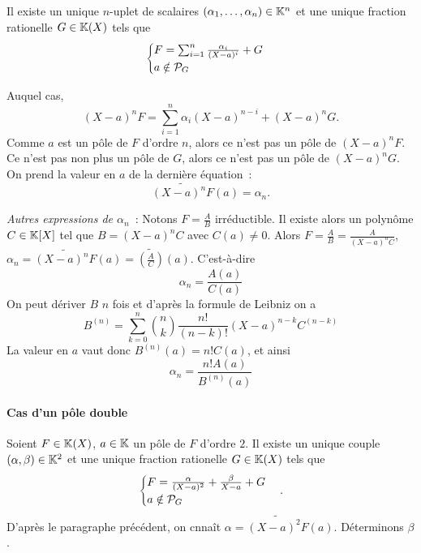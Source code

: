 \begin{theo}
  Il existe un unique \(n\)-uplet de scalaires \((\alpha_1, \ldots, \alpha_n) \in \K^n\) et une unique fraction rationelle \(G \in \K(X)\) tels que
  \begin{equation}
    \begin{cases}
      F = \sum_{i=1}^n \frac{\alpha_i}{(X-a)^i} +G \\
      a \notin \P_G
    \end{cases}
  \end{equation}
\end{theo}

Auquel cas,
\begin{equation}
  (X-a)^nF = \sum_{i=1}^n \alpha_i(X-a)^{n-i} +(X-a)^nG.
\end{equation}
Comme \(a\) est un pôle de \(F\) d'ordre \(n\), alors ce n'est pas un pôle de \((X-a)^nF\). Ce n'est pas non plus un pôle de \(G\), alors ce n'est pas un pôle de \((X-a)^nG\). On prend la valeur en \(a\) de la dernière équation~:
\begin{equation}
  \widetilde{(X-a)^nF}(a)=\alpha_n.
\end{equation}

\emph{Autres expressions de \(\alpha_n\)}~: Notons \(F=\frac{A}{B}\) irréductible. Il existe alors un polynôme \(C \in \K[X]\) tel que \(B=(X-a)^nC\) avec \(C(a)\neq 0\). Alors \(F=\frac{A}{B}=\frac{A}{(X-a)^nC}\), \(\alpha_n = \widetilde{(X-a)^nF}(a)=\widetilde{\left(\frac{A}{C}\right)}(a)\). C'est-à-dire
\begin{equation}
  \alpha_n=\frac{A(a)}{C(a)}
\end{equation}
On peut dériver \(B\) \(n\) fois et d'après la formule de Leibniz on a
\begin{equation}
  B^{(n)} = \sum_{k=0}^n \binom{n}{k} \frac{n!}{(n-k)!}(X-a)^{n-k}C^{(n-k)}
\end{equation}
La valeur en \(a\) vaut donc \(B^{(n)}(a)=n! C(a)\), et ainsi
\begin{equation}
  \alpha_n = \frac{n! A(a)}{B^{(n)}(a)}
\end{equation}

\paragraph{Cas d'un pôle double}

Soient \(F \in \K(X)\), \(a\in\K\) un pôle de \(F\) d'ordre \(2\). Il existe un unique couple \((\alpha,\beta) \in \K^2\) et une unique fraction rationelle \(G \in \K(X)\) tels que
\begin{equation}
  \begin{cases}
    F = \frac{\alpha}{(X-a)^2}+\frac{\beta}{X-a}+G \\
    a \notin \P_G
  \end{cases}.
\end{equation}
D'après le paragraphe précédent, on cnnaît \(\alpha=\widetilde{(X-a)^2F}(a)\). Déterminons \(\beta\).

